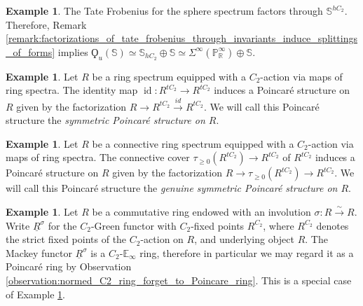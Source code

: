 \documentclass{article}
\DeclareMathOperator{\id}{id} %
\newcommand{\EE}{\mathbb{E}}
\theoremstyle{definition}
\newtheorem{example}[equation]{Example}
\begin{document}
\begin{example}
    \label{example:universal_tate_poincare_splits_at_unit}
    The Tate Frobenius for the sphere spectrum factors through $\mathbb{S}^{hC_2}$. Therefore, Remark \ref{remark:factorizations_of_tate_frobenius_through_invariants_induce_splittings_of_forms} implies $\Qoppa_u(\mathbb{S})\simeq \mathbb{S}_{hC_2}\oplus \mathbb{S}\simeq \Sigma^\infty(\mathbb{P}_\mathbb{R}^\infty) \oplus \mathbb{S}$.
\end{example}

\begin{example}
    \label{example:symmetric_poincare_structure}
    Let $R$ be a ring spectrum equipped with a $C_2$-action via maps of ring spectra. The identity map $\id: R^{tC_2}\rightarrow R^{tC_2}$ induces a Poincaré structure on $R$
    given by the factorization $R\rightarrow R^{tC_2}\xrightarrow{id} R^{tC_2}$. We will call this Poincaré structure the \emph{symmetric Poincaré structure on $R$}.
\end{example}

\begin{example}
    \label{example:genuine_symmetric_poincare_structure}
    Let $R$ be a connective ring spectrum equipped with a $C_2$-action via maps of ring spectra. The connective cover $\tau_{\geq 0}(R^{tC_2})\rightarrow R^{tC_2}$ of $R^{tC_2}$ induces a Poincaré structure on $R$ given by the factorization $R\rightarrow \tau_{\geq 0}(R^{tC_2})\rightarrow R^{tC_2}$. We will call this Poincaré structure the \emph{genuine symmetric Poincaré structure on $R$}.
\end{example}

\begin{example}
    \label{ex:fixpt_Mackey_functor}   
    Let $ R $ be a commutative ring endowed with an involution $ \sigma \colon R \xrightarrow{\sim} R $. 
    Write $ \underline{R}^\sigma $ for the $ C_2 $-Green functor with $ C_2 $-fixed points $ R^{C_2} $, where $ R^{C_2} $ denotes the strict fixed points of the $ C_2 $-action on $ R $, and underlying object $ R $. 
    The Mackey functor $ \underline{R}^\sigma $ is a $ C_2 $-$ \EE_\infty $ ring, therefore in particular we may regard it as a Poincaré ring by Observation \ref{observation:normed_C2_ring_forget_to_Poincare_ring}. 
    This is a special case of Example \ref{example:genuine_symmetric_poincare_structure}. 
\end{example}
\end{document}
